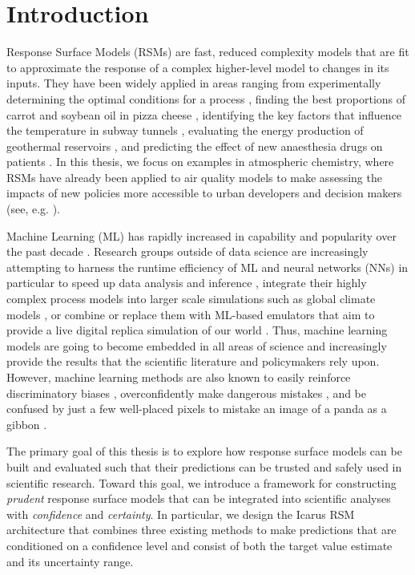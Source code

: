 \chapter{Introduction}

Response Surface Models (RSMs) are fast, reduced complexity models that are fit to approximate the response of a complex higher-level model to changes in its inputs. They have been widely applied in areas ranging from experimentally determining the optimal conditions for a process \cite{response-surface-modelling-1951}, finding the best proportions of carrot and soybean oil in pizza cheese \cite{pizza-optimisation-2018}, identifying the key factors that influence the temperature in subway tunnels \cite{subway-temperature-rsm-2019}, evaluating the energy production of geothermal reservoirs \cite{geothermal-rsm-2016}, and predicting the effect of new anaesthesia drugs on patients \cite{anesthesia-rsm-2015}. In this thesis, we focus on examples in atmospheric chemistry, where RSMs have already been applied to air quality models to make assessing the impacts of new policies more accessible to urban developers and decision makers (see, e.g. \cite{rsm-epa-2006, pf-rsm-2018, deep-rsm-2020}).

Machine Learning (ML) has rapidly increased in capability and popularity over the past decade \cite{ml-trends-2021, ml-applications-2021}. Research groups outside of data science are increasingly attempting to harness the runtime efficiency of ML and neural networks (NNs) in particular to speed up data analysis and inference \cite{srsm-2004}, integrate their highly complex process models into larger scale simulations such as global climate models \cite{hydrology-ml-2021, hybrid-model-2022}, or combine or replace them with ML-based emulators that aim to provide a live digital replica simulation of our world \cite{simulation-ml-2022, virtual-laboratories-2022}. Thus, machine learning models are going to become embedded in all areas of science and increasingly provide the results that the scientific literature and policymakers rely upon. However, machine learning methods are also known to easily reinforce discriminatory biases \cite{ml-bias-discrimination-2017, prediction-inequity-2019}, overconfidently make dangerous mistakes \cite{ood-baseline-2016}, and be confused by just a few well-placed pixels to mistake an image of a panda as a gibbon \cite{aversarial-attacks-2015}.

\newpar The primary goal of this thesis is to explore how response surface models can be built and evaluated such that their predictions can be trusted and safely used in scientific research. Toward this goal, we introduce a framework for constructing \textit{prudent} response surface models that can be integrated into scientific analyses with \textit{confidence} and \textit{certainty}. In particular, we design the Icarus RSM architecture that combines three existing methods to make predictions that are conditioned on a confidence level and consist of both the target value estimate and its uncertainty range.

